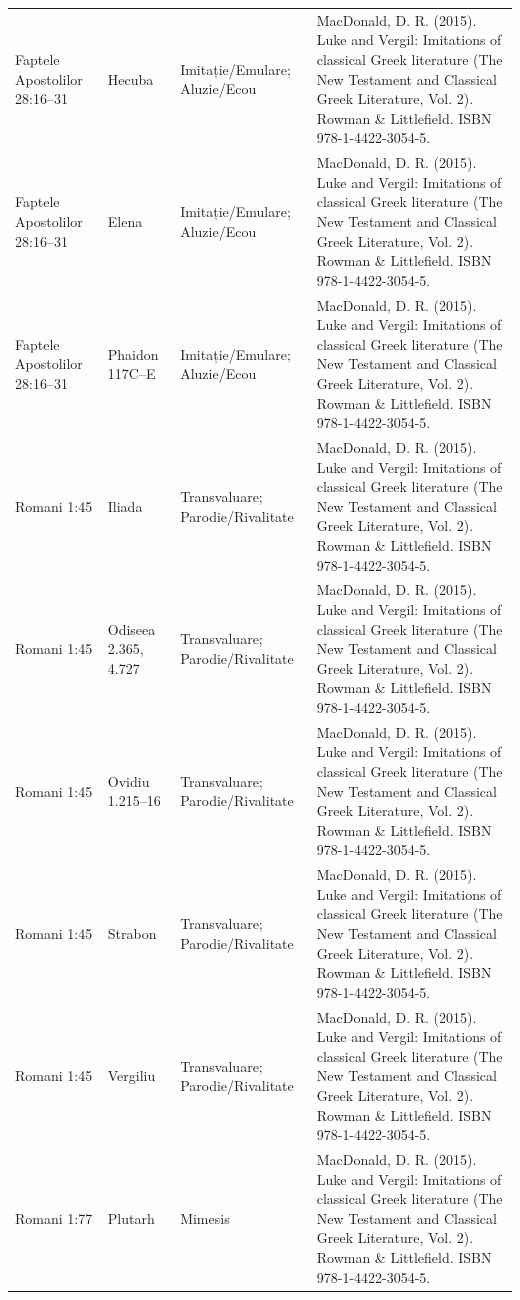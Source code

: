 \documentclass[12pt,a4paper,twoside,openany]{book}
\begin{document}
\begin{longtable}{L{1.4cm}L{1.7cm}L{3.1cm}L{8.4cm}}
Faptele Apostolilor 28:16–31 & Hecuba & Imitație/Emulare; Aluzie/Ecou & MacDonald, D. R. (2015). Luke and Vergil: Imitations of classical Greek literature (The New Testament and Classical Greek Literature, Vol. 2). Rowman \& Littlefield. ISBN 978-1-4422-3054-5. \\
Faptele Apostolilor 28:16–31 & Elena & Imitație/Emulare; Aluzie/Ecou & MacDonald, D. R. (2015). Luke and Vergil: Imitations of classical Greek literature (The New Testament and Classical Greek Literature, Vol. 2). Rowman \& Littlefield. ISBN 978-1-4422-3054-5. \\
Faptele Apostolilor 28:16–31 & Phaidon 117C–E & Imitație/Emulare; Aluzie/Ecou & MacDonald, D. R. (2015). Luke and Vergil: Imitations of classical Greek literature (The New Testament and Classical Greek Literature, Vol. 2). Rowman \& Littlefield. ISBN 978-1-4422-3054-5. \\
Romani 1:45 & Iliada & Transvaluare; Parodie/Rivalitate & MacDonald, D. R. (2015). Luke and Vergil: Imitations of classical Greek literature (The New Testament and Classical Greek Literature, Vol. 2). Rowman \& Littlefield. ISBN 978-1-4422-3054-5. \\
Romani 1:45 & Odiseea 2.365, 4.727 & Transvaluare; Parodie/Rivalitate & MacDonald, D. R. (2015). Luke and Vergil: Imitations of classical Greek literature (The New Testament and Classical Greek Literature, Vol. 2). Rowman \& Littlefield. ISBN 978-1-4422-3054-5. \\
Romani 1:45 & Ovidiu 1.215–16 & Transvaluare; Parodie/Rivalitate & MacDonald, D. R. (2015). Luke and Vergil: Imitations of classical Greek literature (The New Testament and Classical Greek Literature, Vol. 2). Rowman \& Littlefield. ISBN 978-1-4422-3054-5. \\
Romani 1:45 & Strabon & Transvaluare; Parodie/Rivalitate & MacDonald, D. R. (2015). Luke and Vergil: Imitations of classical Greek literature (The New Testament and Classical Greek Literature, Vol. 2). Rowman \& Littlefield. ISBN 978-1-4422-3054-5. \\
Romani 1:45 & Vergiliu & Transvaluare; Parodie/Rivalitate & MacDonald, D. R. (2015). Luke and Vergil: Imitations of classical Greek literature (The New Testament and Classical Greek Literature, Vol. 2). Rowman \& Littlefield. ISBN 978-1-4422-3054-5. \\
Romani 1:77 & Plutarh & Mimesis & MacDonald, D. R. (2015). Luke and Vergil: Imitations of classical Greek literature (The New Testament and Classical Greek Literature, Vol. 2). Rowman \& Littlefield. ISBN 978-1-4422-3054-5. \\

\end{longtable}
\end{document}
